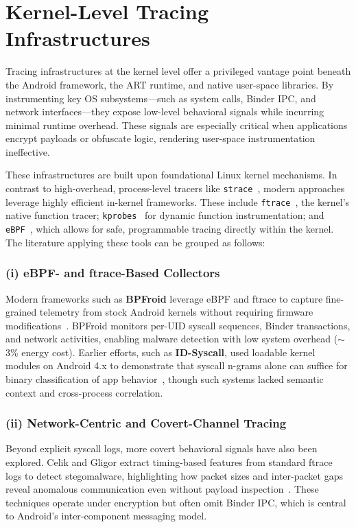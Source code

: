\documentclass[a4paper,12pt]{report}
\begin{document}
\section{Kernel-Level Tracing Infrastructures}
\label{sec:rw:kernel}

Tracing infrastructures at the kernel level offer a privileged vantage point beneath the Android framework, the ART runtime, and native user-space libraries. By instrumenting key OS subsystems—such as system calls, Binder IPC, and network interfaces—they expose low-level behavioral signals while incurring minimal runtime overhead. These signals are especially critical when applications encrypt payloads or obfuscate logic, rendering user-space instrumentation ineffective.

These infrastructures are built upon foundational Linux kernel mechanisms. In contrast to high-overhead, process-level tracers like \texttt{strace}~\cite{strace2023}, modern approaches leverage highly efficient in-kernel frameworks. These include \texttt{ftrace}~\cite{ftrace2023}, the kernel's native function tracer; \texttt{kprobes}~\cite{kprobes2023} for dynamic function instrumentation; and \texttt{eBPF}~\cite{ebpf2023}, which allows for safe, programmable tracing directly within the kernel. The literature applying these tools can be grouped as follows:

\subsubsection*{(i) eBPF- and ftrace-Based Collectors}
Modern frameworks such as \textbf{BPFroid} leverage eBPF and ftrace to capture fine-grained telemetry from stock Android kernels without requiring firmware modifications~\cite{BPFroid2021}. BPFroid monitors per-UID syscall sequences, Binder transactions, and network activities, enabling malware detection with low system overhead ($\sim$3\% energy cost). Earlier efforts, such as \textbf{ID-Syscall}, used loadable kernel modules on Android 4.x to demonstrate that syscall n-grams alone can suffice for binary classification of app behavior~\cite{Schmidt2009IDSyscall}, though such systems lacked semantic context and cross-process correlation.

\subsubsection*{(ii) Network-Centric and Covert-Channel Tracing}
Beyond explicit syscall logs, more covert behavioral signals have also been explored. Celik and Gligor extract timing-based features from standard ftrace logs to detect stegomalware, highlighting how packet sizes and inter-packet gaps reveal anomalous communication even without payload inspection~\cite{celik2021stego}. These techniques operate under encryption but often omit Binder IPC, which is central to Android’s inter-component messaging model.
\end{document}
